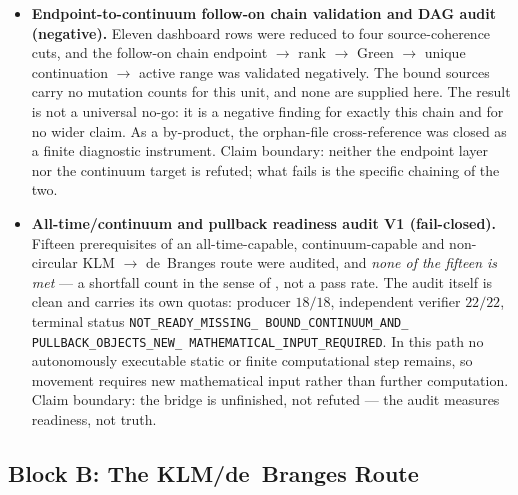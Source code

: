 \documentclass[12pt,a4paper]{article}
\theoremstyle{definition}
\theoremstyle{remark}
\begin{document}
\begin{itemize}
  \item \textbf{Endpoint-to-continuum follow-on chain validation and DAG
    audit (negative).} Eleven dashboard rows were reduced to four
    source-coherence cuts, and the follow-on chain endpoint $\to$ rank
    $\to$ Green $\to$ unique continuation $\to$ active range was validated
    negatively. The bound sources carry no mutation counts for this unit,
    and none are supplied here. The result is not a universal no-go: it is
    a negative finding for exactly this chain and for no wider claim. As a
    by-product, the orphan-file cross-reference was closed as a finite
    diagnostic instrument. Claim boundary: neither the endpoint layer nor
    the continuum target is refuted; what fails is the specific chaining of
    the two.

  \item \textbf{All-time/continuum and pullback readiness audit V1
    (fail-closed).} Fifteen prerequisites of an all-time-capable,
    continuum-capable and non-circular KLM $\to$ de~Branges route were
    audited, and \emph{none of the fifteen is met} --- a shortfall count in
    the sense of , not a pass rate. The audit itself
    is clean and carries its own quotas: producer $18/18$, independent
    verifier $22/22$, terminal status
    \texttt{NOT\_\allowbreak READY\_\allowbreak MISSING\_\allowbreak
    BOUND\_\allowbreak CONTINUUM\_\allowbreak AND\_\allowbreak
    PULLBACK\_\allowbreak OBJECTS\_\allowbreak NEW\_\allowbreak
    MATHEMATICAL\_\allowbreak INPUT\_\allowbreak REQUIRED}. In this path no
    autonomously executable static or finite computational step remains, so
    movement requires new mathematical input rather than further
    computation. Claim boundary: the bridge is unfinished, not refuted ---
    the audit measures readiness, not truth.
\end{itemize}

\subsection{Block B: The KLM/de~Branges Route}
\label{sec:v32-block-b}
\end{document}
